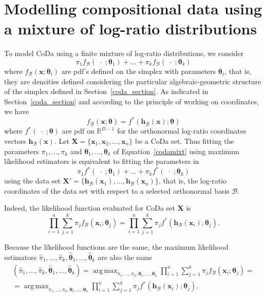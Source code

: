 \documentclass[12pt, a4paper]{article}
\newcommand{\m}[1]{\boldsymbol{#1}}
\DeclareMathOperator*{\argmax}{arg\,max}
\begin{document}
\section{Modelling compositional data using a mixture of log-ratio distributions}
\label{codamix_section}

\noindent To model CoDa using a finite mixture of log-ratio distributions, we consider 
\begin{equation}
\pi_1 f_\mathcal{B}(\;\cdot\; ; \m\theta_1) + \dots + \pi_k f_\mathcal{B}(\;\cdot\; ; \m\theta_k)
\label{codamixt}
\end{equation}
where $f_\mathcal{B}(\textbf{x} ; \m\theta_i)$ are pdf's defined on the simplex with parameters $\m\theta_i$, that is, they are densities defined considering the particular algebraic-geometric structure of the simplex defined in Section~\ref{coda_section}. As  indicated in Section~\ref{coda_section} and according to the principle of working on coordinates, we have
\[f_\mathcal{B}(\textbf{x} ; \m\theta) = f^*(\textbf{h}_\mathcal{B}(\textbf{x}) ; \m\theta)\]
where $f^*(\;\cdot\; ; \m\theta)$ are pdf on $\mathbb{R}^{D-1}$ for the orthonormal log-ratio coordinates vectors $\textbf{h}_\mathcal{B}(\textbf{x})$. Let $\mathbf{X} =  \{ \textbf{x}_1, \textbf{x}_2, \dots , \textbf{x}_n \}$ be a CoDa set. 
Thus fitting the parameters $\pi_1, \dots, \pi_k$ and $\m\theta_1, \dots, \m\theta_k$ of Equation~\ref{codamixt} using maximum likelihood estimators is equivalent to fitting the parameters in
\begin{equation}
\pi_1 f^*(\;\cdot\; ; \m\theta_1) + \dots + \pi_k f^*(\;\cdot\; ; \m\theta_k)
\label{coordmixt}
\end{equation}
using the data set $\mathbf{X}' = \{ \textbf{h}_\mathcal{B}(\mathbf{x}_1), \dots, \textbf{h}_\mathcal{B}(\mathbf{x}_n) \}$, that is, the log-ratio coordinates of the data set with respect to a selected orthonormal basis $\mathcal{B}$.

Indeed, the likelihood function evaluated for CoDa set $\mathbf{X}$ is
\begin{equation}\label{likeli1}
\prod_{i=1}^n \sum_{j=1}^k \pi_j f_\mathcal{B}(\textbf{x}_i; \m\theta_j)=\prod_{i=1}^n \sum_{j=1}^k \pi_j f^*(\textbf{h}_\mathcal{B}(\textbf{x}_i); \m\theta_j).
\end{equation}

Because the likelihood functions are the same,  the maximum likelihood estimators $\hat{\pi}_1, \dots, \hat{\pi}_k, \hat{\m\theta}_1, \dots, \hat{\m\theta}_k$ are also the same
\begin{eqnarray}\label{likeli2}
\left( \hat{\pi}_1, \dots, \hat{\pi}_k, \hat{\m\theta}_1, \dots, \hat{\m\theta}_k\right) = \argmax_{\pi_1, \dots, \pi_k, \m\theta_1, \dots, \m\theta_k} \prod_{i=1}^n \sum_{j=1}^k \pi_j f_\mathcal{B}(\textbf{x}_i; \m\theta_j) = \\ 
= \argmax_{\pi_1, \dots, \pi_k, \m\theta_1, \dots, \m\theta_k} \prod_{i=1}^n \sum_{j=1}^k \pi_j f^*(\textbf{h}_\mathcal{B}(\textbf{x}_i); \m\theta_j).
\end{eqnarray}
\end{document}
